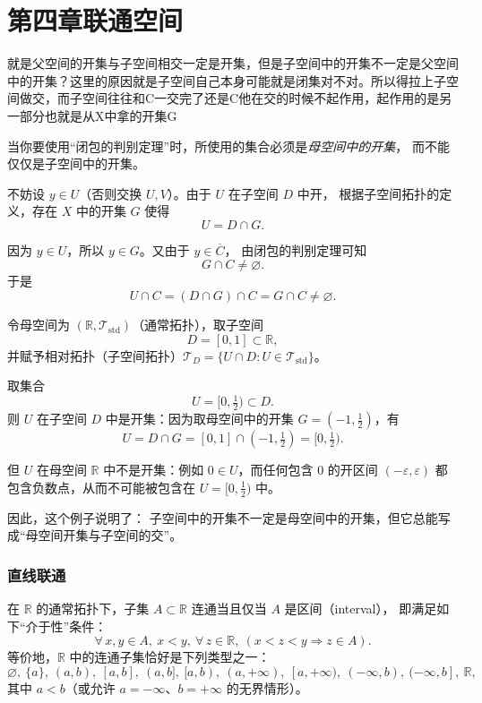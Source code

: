 \chapter{第四章联通空间}
\begin{dxtip}
    就是父空间的开集与子空间相交一定是开集，但是子空间中的开集不一定是父空间中的开集？这里的原因就是子空间自己本身可能就是闭集对不对。所以得拉上子空间做交，而子空间往往和C一交完了还是C他在交的时候不起作用，起作用的是另一部分也就是从X中拿的开集G
\end{dxtip}
\begin{note}
当你要使用“闭包的判别定理”时，所使用的集合必须是\emph{母空间中的开集}，
而不能仅仅是子空间中的开集。

不妨设 $y\in U$（否则交换 $U,V$）。由于 $U$ 在子空间 $D$ 中开，
根据子空间拓扑的定义，存在 $X$ 中的开集 $G$ 使得
\[
U = D \cap G.
\]

因为 $y\in U$，所以 $y\in G$。又由于 $y\in \overline{C}$，
由闭包的判别定理可知
\[
G\cap C \neq \varnothing.
\]
于是
\[
U\cap C = (D\cap G)\cap C = G\cap C \neq \varnothing.
\]
\end{note}
\begin{example}
令母空间为 $(\mathbb{R},\mathcal{T}_{\mathrm{std}})$（通常拓扑），取子空间
\[
D=[0,1]\subset \mathbb{R},
\]
并赋予相对拓扑（子空间拓扑）$\mathcal{T}_D=\{U\cap D:U\in\mathcal{T}_{\mathrm{std}}\}$。

取集合
\[
U=[0,\tfrac12)\subset D.
\]
则 $U$ 在子空间 $D$ 中是开集：因为取母空间中的开集 $G=(-1,\tfrac12)$，有
\[
U=D\cap G=[0,1]\cap(-1,\tfrac12)=[0,\tfrac12).
\]

但 $U$ 在母空间 $\mathbb{R}$ 中不是开集：例如 $0\in U$，而任何包含 $0$ 的开区间
$( -\varepsilon,\varepsilon)$ 都包含负数点，从而不可能被包含在 $U=[0,\tfrac12)$ 中。

因此，这个例子说明了：
子空间中的开集不一定是母空间中的开集，但它总能写成“母空间开集与子空间的交”。
\end{example}
\subsection{直线联通}
\begin{theorem}[实数直线上的连通集刻画]
在 $\mathbb{R}$ 的通常拓扑下，子集 $A\subset\mathbb{R}$ 连通当且仅当 $A$ 是区间（interval），
即满足如下“介于性”条件：
\[
\forall\,x,y\in A,\ x<y,\ \forall\,z\in\mathbb{R},\ (x<z<y \Rightarrow z\in A).
\]
等价地，$\mathbb{R}$ 中的连通子集恰好是下列类型之一：
\[
\varnothing,\ \{a\},\ (a,b),\ [a,b],\ (a,b],\ [a,b),\ (a,+\infty),\ [a,+\infty),\ (-\infty,b),\ (-\infty,b],\ \mathbb{R},
\]
其中 $a<b$（或允许 $a=-\infty$、$b=+\infty$ 的无界情形）。
\end{theorem}
